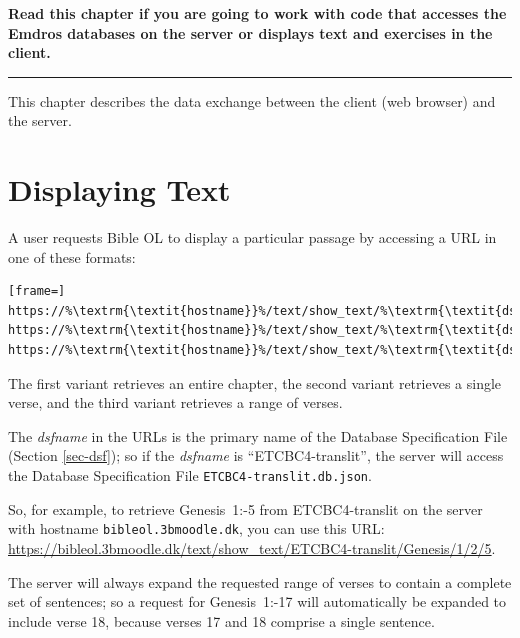 \documentclass[11pt,oneside,a4paper]{memoir}
\newcommand*{\bibleref}[3]{#1~#2\thinspace:\thinspace#3}
\begin{document}
\textbf{Read this chapter if you are going to work with code that accesses the Emdros databases on
  the server or displays text and exercises in the client.}
\plainbreak{3}

This chapter describes the data exchange between the client (web browser)
and the server.

\section{Displaying Text}\label{displaying-text}

A user requests Bible OL to display a particular passage by accessing a URL%
in one of these formats:

\begin{lstlisting}[frame=]
https://%\textrm{\textit{hostname}}%/text/show_text/%\textrm{\textit{dsfname}}%/%\textrm{\textit{book}}%/%\textrm{\textit{chapter}}%
https://%\textrm{\textit{hostname}}%/text/show_text/%\textrm{\textit{dsfname}}%/%\textrm{\textit{book}}%/%\textrm{\textit{chapter}}%/%\textrm{\textit{verse}}%
https://%\textrm{\textit{hostname}}%/text/show_text/%\textrm{\textit{dsfname}}%/%\textrm{\textit{book}}%/%\textrm{\textit{chapter}}%/%\textrm{\textit{firstverse}}%/%\textrm{\textit{lastverse}}%
\end{lstlisting}

The first variant retrieves an entire chapter, the second variant retrieves a single verse, and the
third variant retrieves a range of verses.

The \emph{dsfname} in the URLs is the primary name of the Database Specification File%
(Section \ref{sec-dsf}); so if the \emph{dsfname} is ``ETCBC4-translit'', the
server will access the Database Specification File \texttt{ETCBC4-translit.db.json}.

So, for example, to retrieve \bibleref{Genesis}{1}{2-5} from ETCBC4-translit on the
server with hostname \texttt{bibleol.3bmoodle.dk}, you can use this URL:
\url{https://bibleol.3bmoodle.dk/text/show_text/ETCBC4-translit/Genesis/1/2/5}.

The server will always expand the requested range of verses to contain a complete set of sentences;
so a request for \bibleref{Genesis}{1}{16-17} will automatically be expanded to include verse 18,
because verses 17 and 18 comprise a single sentence.
\end{document}

